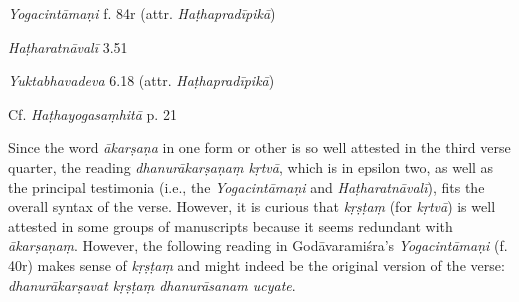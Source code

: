 \begin{ekdosis}
\begin{testimonia}[hp01_025]
\emph{Yogacintāmaṇi} f. 84r (attr. \emph{Haṭhapradīpikā})

\begin{versinnote}
\end{versinnote}

\emph{Haṭharatnāvalī} 3.51

\begin{versinnote}
\tl{\var{ākarṣaṇaṃ kṛtvā ] ākarṣaṇākṛṣṭaṃ P,T,t1}\\!}
\end{versinnote}

\emph{Yuktabhavadeva} 6.18 (attr. \emph{Haṭhapradīpikā})

\begin{versinnote}
\end{versinnote}

Cf. \emph{Haṭhayogasaṃhitā} p. 21

\begin{versinnote}
\end{versinnote}

\end{testimonia}

\begin{philcomm}[hp01_025]
Since the word \emph{ākarṣaṇa} in one form or other is so well attested in the third verse quarter, the reading \emph{dhanurākarṣaṇaṃ kṛtvā}, which is in epsilon two, as well as the principal testimonia (i.e., the \emph{Yogacintāmaṇi} and \emph{Haṭharatnāvalī}), fits the overall syntax of the verse. However, it is curious that \emph{kṛṣṭaṃ} (for \emph{kṛtvā}) is well attested in some groups of manuscripts because it seems redundant with \emph{ākarṣaṇaṃ}. However, the following reading in 
Godāvaramiśra's \emph{Yogacintāmaṇi} (f. 40r) makes sense of \emph{kṛṣṭaṃ} and might indeed be the original version of the verse: \emph{dhanurākarṣavat kṛṣṭaṃ dhanurāsanam ucyate}.


\end{philcomm}
\end{ekdosis}
